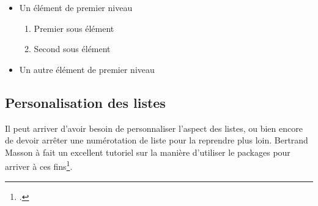\begin{itemize}
	\item Un élément de premier niveau
	\begin{enumerate}
			\item Premier sous élément
			\item Second sous élément
	\end{enumerate}
	\item Un autre élément de premier niveau
\end{itemize}

\subsection{Personalisation des listes}

Il peut arriver d'avoir besoin de personnaliser l'aspect des listes, ou bien encore de devoir arrêter une numérotation de liste pour la reprendre plus loin. Bertrand Masson à fait un excellent tutoriel sur la manière d'utiliser le packages  pour arriver à ces fins\footcite{bebert_liste}. 